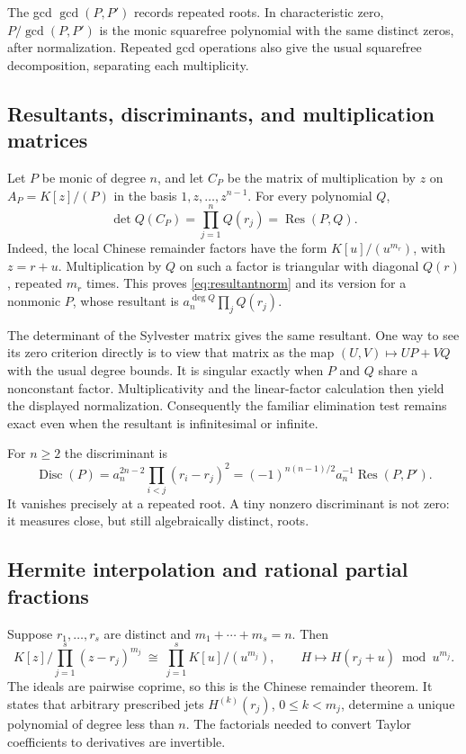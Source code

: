 \documentclass[11pt,letterpaper,oneside]{article}
\numberwithin{equation}{section}
\theoremstyle{definition}
\theoremstyle{remark}\newtheorem{remark}[theorem]{Remark}
\newcommand{\Res}{\operatorname{Res}}\newcommand{\Disc}{\operatorname{Disc}}
\begin{document}
The gcd $\gcd(P,P')$ records repeated roots. In characteristic zero,
$P/\gcd(P,P')$ is the monic squarefree polynomial with the same distinct
zeros, after normalization. Repeated gcd operations also give the usual
squarefree decomposition, separating each multiplicity.

\subsection{Resultants, discriminants, and multiplication matrices}
Let $P$ be monic of degree $n$, and let $C_P$ be the matrix of multiplication
by $z$ on $A_P=K[z]/(P)$ in the basis $1,z,\ldots,z^{n-1}$.
For every polynomial $Q$,
\begin{equation}\label{eq:resultantnorm}
 \det Q(C_P)=\prod_{j=1}^n Q(r_j)=\Res(P,Q).
\end{equation}
Indeed, the local Chinese remainder factors have the form
$K[u]/(u^{m_r})$, with $z=r+u$. Multiplication by $Q$ on such a factor
is triangular with diagonal $Q(r)$, repeated $m_r$ times. This proves
\eqref{eq:resultantnorm} and its version for a nonmonic $P$, whose
resultant is $a_n^{\deg Q}\prod_jQ(r_j)$.

The determinant of the Sylvester matrix gives the same resultant. One way
to see its zero criterion directly is to view that matrix as the map
$(U,V)\mapsto UP+VQ$ with the usual degree bounds. It is singular exactly
when $P$ and $Q$ share a nonconstant factor. Multiplicativity and the
linear-factor calculation then yield the displayed normalization.
Consequently the familiar elimination test remains exact even when the
resultant is infinitesimal or infinite.

For $n\geq2$ the discriminant is
\begin{equation}\label{eq:disc}
 \Disc(P)=a_n^{2n-2}\prod_{i<j}(r_i-r_j)^2
 =(-1)^{n(n-1)/2}a_n^{-1}\Res(P,P').
\end{equation}
It vanishes precisely at a repeated root. A tiny nonzero discriminant
is not zero: it measures close, but still algebraically distinct, roots.

\subsection{Hermite interpolation and rational partial fractions}
Suppose $r_1,\ldots,r_s$ are distinct and $m_1+\cdots+m_s=n$. Then
\begin{equation}\label{eq:hermiteCRT}
 K[z]\Big/\prod_{j=1}^s(z-r_j)^{m_j}
 \ \cong\ \prod_{j=1}^s K[u]/(u^{m_j}),
 \qquad H\longmapsto H(r_j+u)\bmod u^{m_j}.
\end{equation}
The ideals are pairwise coprime, so this is the Chinese remainder theorem.
It states that arbitrary prescribed jets
$H^{(k)}(r_j)$, $0\leq k<m_j$, determine a unique polynomial of degree
less than $n$. The factorials needed to convert Taylor coefficients to
derivatives are invertible.
\end{document}
